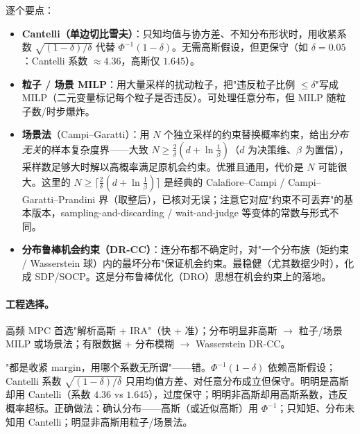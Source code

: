逐个要点：
\begin{itemize}
  \item \textbf{Cantelli（单边切比雪夫）}：只知均值与协方差、不知分布形状时，用收紧系数 $\sqrt{(1-\delta)/\delta}$ 代替 $\Phi^{-1}(1-\delta)$。无需高斯假设，但更保守（如 $\delta=0.05$：Cantelli 系数 $\approx4.36$，高斯仅 $1.645$）。
  \item \textbf{粒子 / 场景 MILP}：用大量采样的扰动粒子，把"违反粒子比例 $\le\delta$"写成 MILP（二元变量标记每个粒子是否违反）。可处理任意分布，但 MILP 随粒子数/时步爆炸。
  \item \textbf{场景法}（Campi--Garatti\cite{campi2008exact}）：用 $N$ 个独立采样的约束替换概率约束，给出\emph{分布无关}的样本复杂度界——大致 $N\ge\frac{2}{\delta}(d+\ln\frac1\beta)$（$d$ 为决策维、$\beta$ 为置信），采样数足够大时解以高概率满足原机会约束。优雅且通用，代价是 $N$ 可能很大。这里的 $N\ge\lceil\frac{2}{\delta}(d+\ln\frac1\beta)\rceil$ 是经典的 Calafiore--Campi / Campi--Garatti--Prandini 界（取整后），已核对无误；注意它对应"约束不可丢弃"的基本版本，sampling-and-discarding / wait-and-judge 等变体的常数与形式不同。
  \item \textbf{分布鲁棒机会约束（DR-CC）}：连分布都不确定时，对"一个分布族（矩约束 / Wasserstein 球）内的最坏分布"保证机会约束。最稳健（尤其数据少时），化成 SDP/SOCP。这是分布鲁棒优化（DRO）思想在机会约束上的落地。
\end{itemize}

\paragraph{工程选择。}
高频 MPC 首选"解析高斯 + IRA"（快 + 准）；分布明显非高斯 $\to$ 粒子/场景 MILP 或场景法；有限数据 + 分布模糊 $\to$ Wasserstein DR-CC。

\begin{pitfall}
"都是收紧 margin，用哪个系数无所谓"——错。$\Phi^{-1}(1-\delta)$ 依赖高斯假设；Cantelli 系数 $\sqrt{(1-\delta)/\delta}$ 只用均值方差、对任意分布成立但保守。明明是高斯却用 Cantelli（系数 $4.36$ vs $1.645$），过度保守；明明非高斯却用高斯系数，违反概率超标。正确做法：确认分布——高斯（或近似高斯）用 $\Phi^{-1}$；只知矩、分布未知用 Cantelli；明显非高斯用粒子/场景法。
\end{pitfall}

